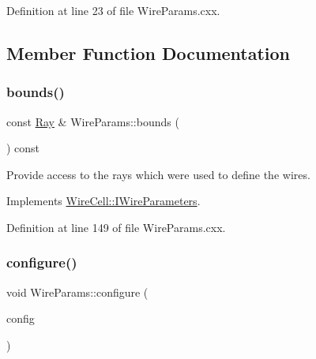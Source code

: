 Definition at line 23 of file Wire\+Params.\+cxx.



\subsection{Member Function Documentation}
\mbox{\label{class_wire_cell_1_1_wire_params_a20e01f2e7d229f28e0e2d414b36b4e57}} 
\subsubsection{\texorpdfstring{bounds()}{bounds()}}
{\footnotesize\ttfamily const \hyperlink{namespace_wire_cell_a3ab20d9b438feb7eb1ffaab9ba98af0c}{Ray} \& Wire\+Params\+::bounds (\begin{DoxyParamCaption}{ }\end{DoxyParamCaption}) const\hspace{0.3cm}{\ttfamily [virtual]}}

Provide access to the rays which were used to define the wires. 

Implements \hyperlink{class_wire_cell_1_1_i_wire_parameters_a4cc116cbfff382ec8ba7711df078f845}{Wire\+Cell\+::\+I\+Wire\+Parameters}.



Definition at line 149 of file Wire\+Params.\+cxx.

\mbox{\label{class_wire_cell_1_1_wire_params_a8d20db605558e5fa6afaa7c5cf53ae4f}} 
\subsubsection{\texorpdfstring{configure()}{configure()}}
{\footnotesize\ttfamily void Wire\+Params\+::configure (\begin{DoxyParamCaption}\item[{const \hyperlink{namespace_wire_cell_a9f705541fc1d46c608b3d32c182333ee}{Wire\+Cell\+::\+Configuration} \&}]{config }\end{DoxyParamCaption})\hspace{0.3cm}{\ttfamily [virtual]}}

